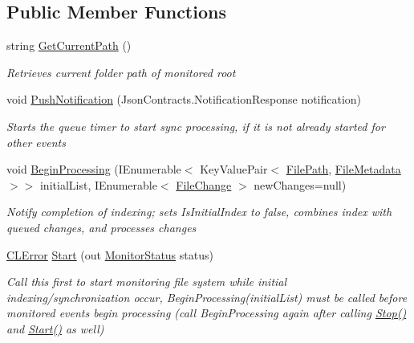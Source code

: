 \subsection*{Public Member Functions}
\begin{DoxyCompactItemize}
\item 
string \hyperlink{class_cloud_api_public_1_1_file_monitor_1_1_monitor_agent_a4f8355a65a49af520f5bad5e012d6005}{Get\-Current\-Path} ()
\begin{DoxyCompactList}\small\item\em Retrieves current folder path of monitored root \end{DoxyCompactList}\item 
void \hyperlink{class_cloud_api_public_1_1_file_monitor_1_1_monitor_agent_a75c1ea853f4abeb5de7f9b35f580ec15}{Push\-Notification} (Json\-Contracts.\-Notification\-Response notification)
\begin{DoxyCompactList}\small\item\em Starts the queue timer to start sync processing, if it is not already started for other events \end{DoxyCompactList}\item 
void \hyperlink{class_cloud_api_public_1_1_file_monitor_1_1_monitor_agent_af6a13b7d0c183eda555e669a90e3f122}{Begin\-Processing} (I\-Enumerable$<$ Key\-Value\-Pair$<$ \hyperlink{class_cloud_api_public_1_1_model_1_1_file_path}{File\-Path}, \hyperlink{class_cloud_api_public_1_1_model_1_1_file_metadata}{File\-Metadata} $>$$>$ initial\-List, I\-Enumerable$<$ \hyperlink{class_cloud_api_public_1_1_model_1_1_file_change}{File\-Change} $>$ new\-Changes=null)
\begin{DoxyCompactList}\small\item\em Notify completion of indexing; sets Is\-Initial\-Index to false, combines index with queued changes, and processes changes \end{DoxyCompactList}\item 
\hyperlink{class_cloud_api_public_1_1_model_1_1_c_l_error}{C\-L\-Error} \hyperlink{class_cloud_api_public_1_1_file_monitor_1_1_monitor_agent_a7fd0bcb1837d5a27a32385232f6f463b}{Start} (out \hyperlink{namespace_cloud_api_public_1_1_static_a31db95951688473984962a22ad05a45f}{Monitor\-Status} status)
\begin{DoxyCompactList}\small\item\em Call this first to start monitoring file system while initial indexing/synchronization occur, Begin\-Processing(initial\-List) must be called before monitored events begin processing (call Begin\-Processing again after calling \hyperlink{class_cloud_api_public_1_1_file_monitor_1_1_monitor_agent_ae9123602c7ba50f698e71b6904ba8cb6}{Stop()} and \hyperlink{class_cloud_api_public_1_1_file_monitor_1_1_monitor_agent_a7fd0bcb1837d5a27a32385232f6f463b}{Start()} as well) \end{DoxyCompactList}\item 
$$
\end{DoxyCompactItemize}

